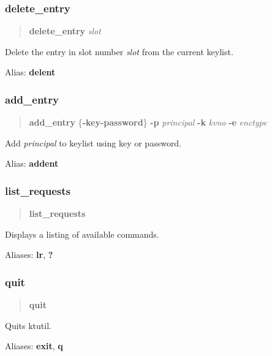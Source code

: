 \documentclass[letterpaper,10pt,english]{sphinxmanual}
\begin{document}
\subsubsection{delete\_entry}
\label{admin/admin_commands/ktutil:delete-entry}\begin{quote}

\textbf{delete\_entry} \emph{slot}
\end{quote}

Delete the entry in slot number \emph{slot} from the current keylist.

Alias: \textbf{delent}


\subsubsection{add\_entry}
\label{admin/admin_commands/ktutil:add-entry}\begin{quote}

\textbf{add\_entry} \{\textbf{-key}\textbar{}\textbf{-password}\} \textbf{-p} \emph{principal}
\textbf{-k} \emph{kvno} \textbf{-e} \emph{enctype}
\end{quote}

Add \emph{principal} to keylist using key or password.

Alias: \textbf{addent}


\subsubsection{list\_requests}
\label{admin/admin_commands/ktutil:list-requests}\begin{quote}

\textbf{list\_requests}
\end{quote}

Displays a listing of available commands.

Aliases: \textbf{lr}, \textbf{?}


\subsubsection{quit}
\label{admin/admin_commands/ktutil:quit}\begin{quote}

\textbf{quit}
\end{quote}

Quits ktutil.

Aliases: \textbf{exit}, \textbf{q}
\end{document}
